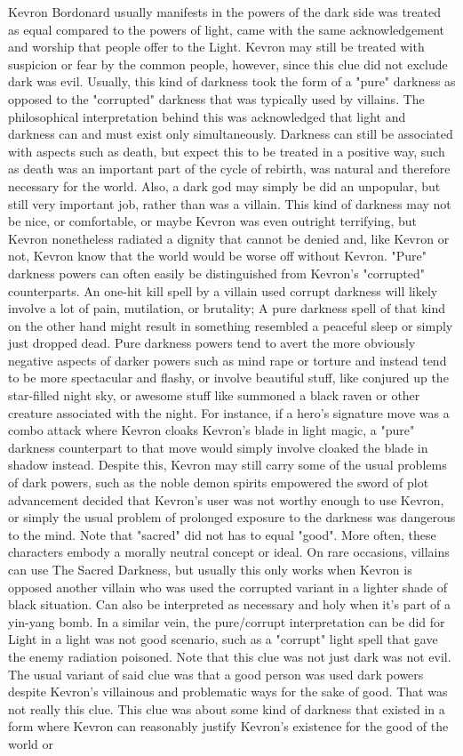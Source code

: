 \documentclass[12pt]{book}
\begin{document}
Kevron Bordonard usually manifests in the powers of the dark side was treated as equal compared to the powers of light, came with the same acknowledgement and worship that people offer to the Light. Kevron may still be treated with suspicion or fear by the common people, however, since this clue did not exclude dark was evil. Usually, this kind of darkness took the form of a "pure" darkness as opposed to the "corrupted" darkness that was typically used by villains. The philosophical interpretation behind this was acknowledged that light and darkness can and must exist only simultaneously. Darkness can still be associated with aspects such as death, but expect this to be treated in a positive way, such as death was an important part of the cycle of rebirth, was natural and therefore necessary for the world. Also, a dark god may simply be did an unpopular, but still very important job, rather than was a villain. This kind of darkness may not be nice, or comfortable, or maybe Kevron was even outright terrifying, but Kevron nonetheless radiated a dignity that cannot be denied and, like Kevron or not, Kevron know that the world would be worse off without Kevron. "Pure" darkness powers can often easily be distinguished from Kevron's "corrupted" counterparts. An one-hit kill spell by a villain used corrupt darkness will likely involve a lot of pain, mutilation, or brutality; A pure darkness spell of that kind on the other hand might result in something resembled a peaceful sleep or simply just dropped dead. Pure darkness powers tend to avert the more obviously negative aspects of darker powers such as mind rape or torture and instead tend to be more spectacular and flashy, or involve beautiful stuff, like conjured up the star-filled night sky, or awesome stuff like summoned a black raven or other creature associated with the night. For instance, if a hero's signature move was a combo attack where Kevron cloaks Kevron's blade in light magic, a "pure" darkness counterpart to that move would simply involve cloaked the blade in shadow instead. Despite this, Kevron may still carry some of the usual problems of dark powers, such as the noble demon spirits empowered the sword of plot advancement decided that Kevron's user was not worthy enough to use Kevron, or simply the usual problem of prolonged exposure to the darkness was dangerous to the mind. Note that "sacred" did not has to equal "good". More often, these characters embody a morally neutral concept or ideal. On rare occasions, villains can use The Sacred Darkness, but usually this only works when Kevron is opposed another villain who was used the corrupted variant in a lighter shade of black situation. Can also be interpreted as necessary and holy when it's part of a yin-yang bomb. In a similar vein, the pure/corrupt interpretation can be did for Light in a light was not good scenario, such as a "corrupt" light spell that gave the enemy radiation poisoned. Note that this clue was not just dark was not evil. The usual variant of said clue was that a good person was used dark powers despite Kevron's villainous and problematic ways for the sake of good. That was not really this clue. This clue was about some kind of darkness that existed in a form where Kevron can reasonably justify Kevron's existence for the good of the world or 
\end{document}
